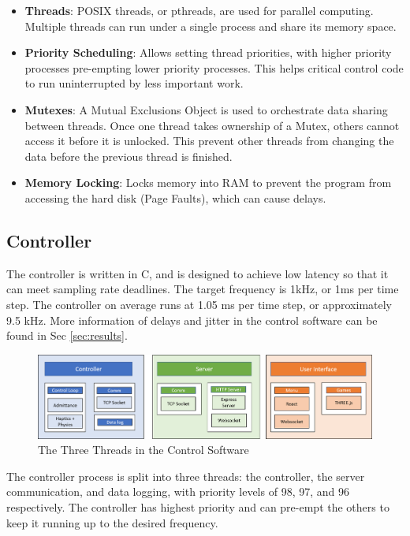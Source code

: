 \documentclass[12pt]{report}
\begin{document}
\begin{itemize}
	\item \textbf{Threads}: POSIX threads, or pthreads, are used for parallel computing. Multiple threads can run under a single process and share its memory space.
	\item \textbf{Priority Scheduling}: Allows setting thread priorities, with higher priority processes pre-empting lower priority processes. This helps critical control code to run uninterrupted by less important work. 
	\item \textbf{Mutexes}: A Mutual Exclusions Object is used to orchestrate data sharing between threads. Once one thread takes ownership of a Mutex, others cannot access it before it is unlocked. This prevent other threads from changing the data before the previous thread is finished. 
	\item \textbf{Memory Locking}: Locks memory into RAM to prevent the program from accessing the hard disk (Page Faults), which can cause delays. 
\end{itemize}
	
	\subsection{Controller}
	
	The controller is written in C, and is designed to achieve low latency so that it can meet sampling rate deadlines. The target frequency is 1kHz, or 1ms per time step. The controller on average runs at 1.05 ms per time step, or approximately 9.5 kHz. More information of delays and jitter in the control software can be found in Sec \ref{sec:results}. 
	
		\begin{figure}[h] 
		\centering
		\includegraphics[width=\linewidth]{software}
		\caption{The Three Threads in the Control Software}
		\label{fig:software}
	\end{figure} 
	
	
	The controller process is split into three threads: the controller, the server communication, and data logging, with priority levels of 98, 97, and 96 respectively. The controller has highest priority and can pre-empt the others to keep it running up to the desired frequency. 
	
\end{document}
